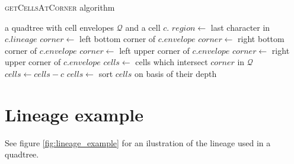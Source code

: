 \begin{algorithm} \caption{\textsc{getCellsAtCorner} algorithm}\label{alg:two}
    \begin{algorithmic}
    \Require a quadtree with cell envelopes $\mathcal Q$ and a cell $c$.
        \State $region \gets $ last character in $c.lineage$
                \State $corner \gets$ left bottom corner of $c.envelope$
            \EndCase
                \State $corner \gets$ right bottom corner of $c.envelope$
            \EndCase
                \State $corner \gets$ left upper corner of $c.envelope$
            \EndCase
                \State $corner \gets$ right upper corner of $c.envelope$
            \EndCase
        \EndSwitch
        \State $cells \gets$ cells which intersect $corner$ in $\mathcal Q$
        \State $cells \gets cells - c$ 
        \State $cells \gets$ sort $cells$ on basis of their depth 
        \State {}
    \EndFunction
    \end{algorithmic}
\end{algorithm}

\section{Lineage example}
See figure \ref{fig:lineage_example} for an ilustration of the lineage used in a quadtree.

